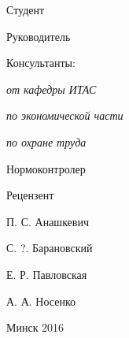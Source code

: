 \begin{minipage}{.6\textwidth}
Студент

Руководитель

Консультанты:

\hspace{0.3em} \textit{от кафедры ИТАС}

\hspace{0.3em} \textit{по экономической части}

\hspace{0.3em} \textit{по охране труда}

Нормоконтролер

\smallskip
Рецензент
\end{minipage}
\hfill
\begin{minipage}{.3\textwidth}
  П. С. Анашкевич

  С. ?. Барановский

  \vspace{\baselineskip}
  Е. Р. Павловская

  А. А. Носенко

  \color{red}{???}

  \color{red}{???}

  \smallskip
  \color{red}{???}
\end{minipage}

\vfill

{\centering{}
  Минск 2016\par
}

\setlength{\parindent}{1.25cm} %
